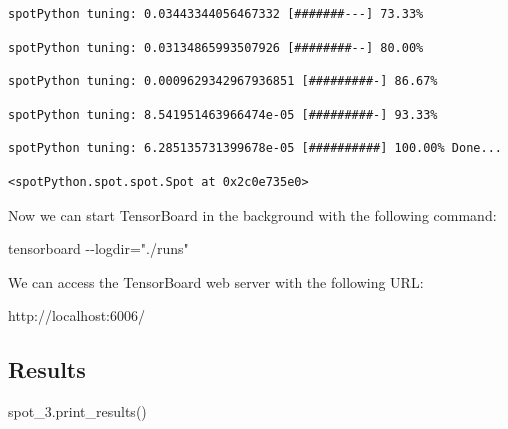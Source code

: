 \documentclass[
  letterpaper,
  DIV=11,
  numbers=noendperiod]{scrreprt}
\newenvironment{Shaded}{\begin{snugshade}}{\end{snugshade}}
\newcommand{\NormalTok}[1]{\textcolor[rgb]{0.00,0.23,0.31}{#1}}
\begin{document}
\begin{verbatim}
spotPython tuning: 0.03443344056467332 [#######---] 73.33% 
\end{verbatim}

\begin{verbatim}
spotPython tuning: 0.03134865993507926 [########--] 80.00% 
\end{verbatim}

\begin{verbatim}
spotPython tuning: 0.0009629342967936851 [#########-] 86.67% 
\end{verbatim}

\begin{verbatim}
spotPython tuning: 8.541951463966474e-05 [#########-] 93.33% 
\end{verbatim}

\begin{verbatim}
spotPython tuning: 6.285135731399678e-05 [##########] 100.00% Done...
\end{verbatim}

\begin{verbatim}
<spotPython.spot.spot.Spot at 0x2c0e735e0>
\end{verbatim}

Now we can start TensorBoard in the background with the following
command:

\begin{Shaded}
\begin{Highlighting}[]
\NormalTok{tensorboard {-}{-}logdir="./runs"}
\end{Highlighting}
\end{Shaded}

We can access the TensorBoard web server with the following URL:

\begin{Shaded}
\begin{Highlighting}[]
\NormalTok{http://localhost:6006/}
\end{Highlighting}
\end{Shaded}

\hypertarget{results}{%
\subsection{Results}\label{results}}

\begin{Shaded}
\begin{Highlighting}[]
\NormalTok{spot\_3.print\_results()}
\end{Highlighting}
\end{Shaded}
\end{document}
